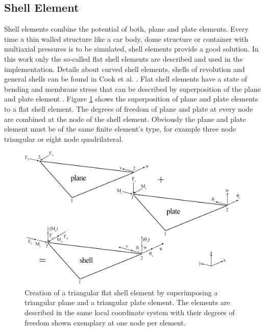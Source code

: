  \subsection{Shell Element}
 Shell elements combine the potential of both, plane and plate elements. Every time a thin walled structure like a car body, dome structure or container with multiaxial pressures is to be simulated, shell elements provide a good solution. In this work only the so-called flat shell elements are described and used in the implementation. Details about curved shell elements, shells of revolution and general shells can be found in Cook et al. \cite{cook2002concepts}. Flat shell elements have a state of bending and membrane stress that can be described by superposition of the plane and plate element \cite{klein2013fem}. Figure \ref{fig:shell_triangle} shows the superposition of plane and plate elements to a flat shell element. The degrees of freedom of plane and plate at every node are combined at the node of the shell element. Obviously the plane and plate element must be of the same finite element's type, for example three node triangular or eight node quadrilateral.
 \begin{figure} %
 	\centering
 	\includegraphics[width=0.97\linewidth]{figures/shell_triangle}
 	\caption{Creation of a triangular flat shell element by superimposing a triangular plane and a triangular plate element. The elements are described in the same local coordinate system with their degrees of freedom shown exemplary at one node per element.}
 	\label{fig:shell_triangle}
 \end{figure}
